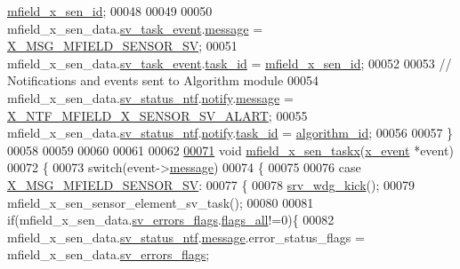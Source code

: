\begin{DoxyCode}
      \hyperlink{a00050_a19a33e680bf19d1aed76750132ed8b64}{mfield\_x\_sen\_id};
00048 
00049 
00050     mfield\_x\_sen\_data.\hyperlink{a00025_a43c345f39ea3aefbb60ef1ef57fe5d83}{sv\_task\_event}.\hyperlink{a00036_adf9665938515a20c283eea2c978cf80d}{message}              = 
      \hyperlink{a00025_a510020575747f82c587c5485b8619f78}{X\_MSG\_MFIELD\_SENSOR\_SV};
00051     mfield\_x\_sen\_data.\hyperlink{a00025_a43c345f39ea3aefbb60ef1ef57fe5d83}{sv\_task\_event}.\hyperlink{a00036_a21b41e494a28583d4da10f1afb1c5328}{task\_id}              = 
      \hyperlink{a00050_a19a33e680bf19d1aed76750132ed8b64}{mfield\_x\_sen\_id};
00052 
00053     \textcolor{comment}{// Notifications and events sent to Algorithm module}
00054     mfield\_x\_sen\_data.\hyperlink{a00025_a752b00333ec308e07c6bd41aa9a01e73}{sv\_status\_ntf}.\hyperlink{a00019_a8e6a04c2283f9fd7b8dcbc62faba5847}{notify}.\hyperlink{a00036_adf9665938515a20c283eea2c978cf80d}{message}                     = 
      \hyperlink{a00021_a9d9558fb2155bafac3683d00b2a18b3f}{X\_NTF\_MFIELD\_X\_SENSOR\_SV\_ALART};
00055     mfield\_x\_sen\_data.\hyperlink{a00025_a752b00333ec308e07c6bd41aa9a01e73}{sv\_status\_ntf}.\hyperlink{a00019_a8e6a04c2283f9fd7b8dcbc62faba5847}{notify}.\hyperlink{a00036_a21b41e494a28583d4da10f1afb1c5328}{task\_id}                 = 
      \hyperlink{a00021_aff3e3d622fcd96787628167d3c1856f9}{algorithm\_id};
00056 
00057 \}
00058 
00059 
00060 
00061 
00062 
\hypertarget{a00050_source_l00071}{}\hyperlink{a00050_a72e9235043dc4a8469143a6eb48bf117}{00071} \textcolor{keywordtype}{void} \hyperlink{a00050_a72e9235043dc4a8469143a6eb48bf117}{mfield\_x\_sen\_taskx}(\hyperlink{a00036_de/d37/a00849}{x\_event} *event)
00072 \{
00073     \textcolor{keywordflow}{switch}(event->\hyperlink{a00036_adf9665938515a20c283eea2c978cf80d}{message})
00074     \{
00075 
00076         \textcolor{keywordflow}{case} \hyperlink{a00025_a510020575747f82c587c5485b8619f78}{X\_MSG\_MFIELD\_SENSOR\_SV}:
00077         \{
00078             \hyperlink{a00067_a710d148845397582739d170341f3d3d9}{srv\_wdg\_kick}();
00079             mfield\_x\_sen\_sensor\_element\_sv\_task();
00080 
00081             \textcolor{keywordflow}{if}(mfield\_x\_sen\_data.\hyperlink{a00025_aaeec6b0609dba31393f337abf1cce3d3}{sv\_errors\_flags}.\hyperlink{a00022_a1caa87b00c878186140c3bac9c8acf3b}{flags\_all}!=0)\{
00082              mfield\_x\_sen\_data.\hyperlink{a00025_a752b00333ec308e07c6bd41aa9a01e73}{sv\_status\_ntf}.\hyperlink{a00019_a946af134546e64739ccfd37633480dc2}{message}.error\_status\_flags = 
      mfield\_x\_sen\_data.\hyperlink{a00025_aaeec6b0609dba31393f337abf1cce3d3}{sv\_errors\_flags};

\end{DoxyCode}
